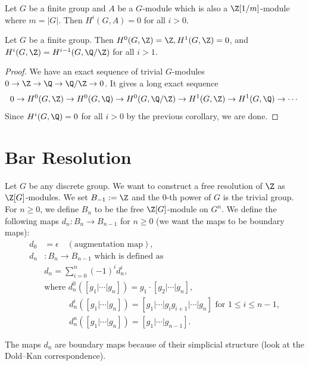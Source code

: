 \begin{corollary}
    Let $G$ be a finite group and $A$ be a $G$-module
    which is also a $\Z[1/m]$-module where $m = |G|$.
    Then $H^i(G, A) = 0$ for all $i > 0$.
\end{corollary}

\begin{corollary}
    Let $G$ be a finite group.
    Then $H^0(G, \Z) = \Z, H^1(G, \Z) = 0$,
    and $H^i(G, \Z)= H^{i-1}(G, \Q/\Z)$ for all $i > 1$.
\end{corollary}
\begin{proof}
    We have an exact sequence of trivial $G$-modules $0 \to \Z \to \Q \to \Q/\Z \to 0$.
    It gives a long exact sequence
    \[
        0 \to H^0(G, \Z) \to H^0(G, \Q) \to H^0(G, \Q/\Z) \to H^1(G, \Z) \to H^1(G, \Q) \to \cdots
    \]
    Since $H^i(G, \Q) = 0$ for all $i > 0$ by the previous corollary,
    we are done.
\end{proof}

\newpage
\section{Bar Resolution}
Let $G$ be any discrete group.
We want to construct a free resolution of $\Z$ as $\Z[G]$-modules.
We set $B_{-1}:= \Z$ and the $0$-th power of $G$ is the trivial group.
For $n \geq 0$, we define $B_n$ to be the free $\Z[G]$-module on $G^n$.
We define the following maps $d_n: B_n \to B_{n-1}$ for $n \geq 0$
(we want the maps to be boundary maps):
\begin{align*}
    d_0 &= \epsilon \quad(\text{augmentation map}),\\
    d_n &: B_n \to B_{n-1} \text{ which is defined as}\\
    \quad &d_n= \sum_{i=0}^n (-1)^i d_n^i,\\
    &\text{where } d_n^0([g_1|\cdots|g_n]) = g_1 \cdot [g_2|\cdots|g_n],\\
    &\quad\qquad d_n^i([g_1|\cdots|g_n]) = [g_1|\cdots|g_ig_{i+1}|\cdots|g_n] \text{ for } 1 \leq i \leq n-1,\\
    &\quad\qquad d_n^n([g_1|\cdots|g_n]) = [g_1|\cdots|g_{n-1}].
\end{align*}

The maps $d_n$ are boundary maps because of their simplicial structure (look at the Dold–Kan correspondence).

